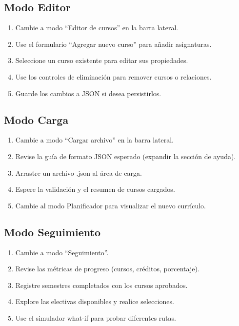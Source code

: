 \documentclass[12pt]{report}
\begin{document}
\subsection{Modo Editor}
\begin{enumerate}
    \item Cambie a modo ``Editor de cursos'' en la barra lateral.
    \item Use el formulario ``Agregar nuevo curso'' para añadir asignaturas.
    \item Seleccione un curso existente para editar sus propiedades.
    \item Use los controles de eliminación para remover cursos o relaciones.
    \item Guarde los cambios a JSON si desea persistirlos.
\end{enumerate}

\subsection{Modo Carga}
\begin{enumerate}
    \item Cambie a modo ``Cargar archivo'' en la barra lateral.
    \item Revise la guía de formato JSON esperado (expandir la sección de ayuda).
    \item Arrastre un archivo .json al área de carga.
    \item Espere la validación y el resumen de cursos cargados.
    \item Cambie al modo Planificador para visualizar el nuevo currículo.
\end{enumerate}

\subsection{Modo Seguimiento}
\begin{enumerate}
    \item Cambie a modo ``Seguimiento''.
    \item Revise las métricas de progreso (cursos, créditos, porcentaje).
    \item Registre semestres completados con los cursos aprobados.
    \item Explore las electivas disponibles y realice selecciones.
    \item Use el simulador what-if para probar diferentes rutas.
\end{enumerate}
\end{document}
